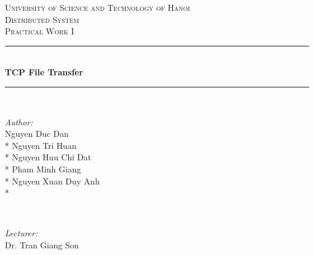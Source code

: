\documentclass[12pt]{article}
\begin{document}
	
	\begin{titlepage}
		
		\newcommand{\HRule}{\rule{\linewidth}{0.1mm}} %
		
		\center %
		
		
		\textsc{\LARGE University of Science and
			\linebreak
			\linebreak
			Technology of Hanoi}\\[2cm] %
		\textsc{\Large Distributed System}\\[0.5cm] %
		\textsc{\large Practical Work I}\\[0.5cm] %
		
		
		\HRule \\[0.4cm]
		{ \huge \bfseries  TCP File Transfer}\\[0.4cm] %
		\HRule \\[1.5cm]
		
		
		\begin{minipage}[t]{0.4\textwidth}
			\begin{flushleft} \large
				\emph{Author:}\\
				Nguyen Duc Dan \\*
				Nguyen Tri Huan	 \\*	
				Nguyen Huu Chi Dat \\* 
				Pham Minh Giang \\*
				Nguyen Xuan Duy Anh \\*
			\end{flushleft}
		\end{minipage}
		~
		\begin{minipage}[t]{0.4\textwidth}
			\begin{flushright} \large
				\emph{Lecturer:} \\
				Dr. Tran Giang Son %
			\end{flushright}
		\end{minipage}\\[2cm]
		

\end{titlepage}
\end{document}
